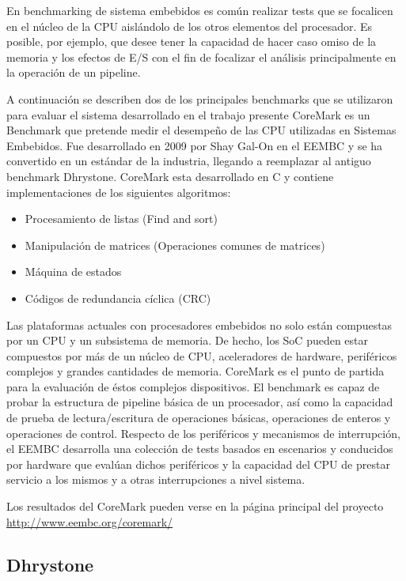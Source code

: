 \documentclass[conference]{IEEEtran}
\begin{document}
En benchmarking de sistema embebidos es común realizar tests que se
focalicen en el núcleo de la CPU aislándolo de los otros elementos del
procesador. Es posible, por ejemplo, que desee tener la capacidad de
hacer caso omiso de la memoria y los efectos de E/S con el fin de
focalizar el análisis principalmente en la operación de un pipeline.

A continuación se describen dos de los principales benchmarks que se
utilizaron para evaluar el sistema desarrollado en el trabajo presente
CoreMark es un Benchmark que pretende medir el desempeño de las CPU
utilizadas en Sistemas Embebidos. Fue desarrollado en 2009 por Shay
Gal-On en el EEMBC y se ha convertido en un estándar de la
industria, llegando a reemplazar al antiguo benchmark
Dhrystone. CoreMark esta desarrollado en C y contiene implementaciones
de los siguientes algoritmos:
	
\begin{itemize}
\item Procesamiento de listas (Find and sort)
\item Manipulación de matrices (Operaciones comunes de matrices)
\item Máquina de estados 
\item Códigos de redundancia cíclica (CRC)  
\end{itemize}	 
	
Las plataformas actuales con procesadores embebidos no solo están
compuestas por un CPU y un subsistema de memoria. De hecho, los SoC
pueden estar compuestos por más de un núcleo de CPU, aceleradores de
hardware, periféricos complejos y grandes cantidades de
memoria. CoreMark es el punto de partida para la evaluación de éstos
complejos dispositivos. El benchmark es capaz de probar la estructura
de pipeline básica de un procesador, así como la capacidad de prueba
de lectura/escritura de operaciones básicas, operaciones de enteros y
operaciones de control. Respecto de los periféricos y mecanismos de
interrupción, el EEMBC desarrolla una colección de tests basados en
escenarios y conducidos por hardware que evalúan dichos periféricos
y la capacidad del CPU de prestar servicio a los mismos y a otras
interrupciones a nivel sistema.
	
Los resultados del CoreMark pueden verse en la página principal   
del proyecto \url{http://www.eembc.org/coremark/}

\subsection{Dhrystone}
\end{document}
